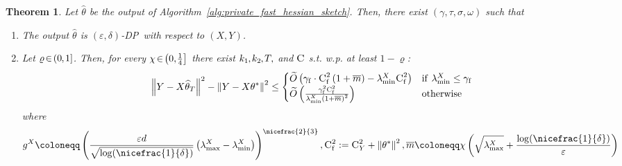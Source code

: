 \documentclass[11pt]{article}
\newtheorem{thm}{Theorem}
\theoremstyle{definition}
\theoremstyle{plain}
\providecommand{\algorithmref}[1]{Algorithm~\ref{#1}}
\newcommand{\eps}{{\varepsilon}}
\newcommand{\Norm}[1]{\left\| #1 \right\|}
\providecommand{\norm}[1]{\Norm{#1}}
\newcommand{\DP}{{\normalfont DP}~}
\renewcommand{\eps}{\varepsilon}
\begin{document}
\begin{thm}
    \label{thm:main_fihm}
    Let $\widehat{\theta}$ be the output of \algorithmref{alg:private_fast_hessian_sketch}. Then, there exist $(\gamma, \tau, \sigma, \omega)$ such that 
    \begin{enumerate}
        \item The output $\widehat{\theta}$ is $(\eps, \delta)$-\DP with respect to $(X,Y)$. 
        \item Let \(\varrho \hspace{-0.15em}\in\hspace{-0.15em} (0\hspace{-0.05em},\hspace{-0.05em}1]\). Then, for every \(\chi \hspace{-0.15em}\in\hspace{-0.15em} \bigl(0,\hspace{-0.1em}\frac{1}{4}\bigr]\) there exist \(k_1\hspace{-0.05em},\hspace{-0.05em} k_2\hspace{-0.05em},\hspace{-0.05em} T,\) and \(\textsc{C}\) s.t. w.p. at least \(1-\varrho\):
        \vspace{-0.2em}
        \begin{equation}
            \label{eq:iterative_fast_hessian_sketch_bound_empirical}
            \norm{Y - X\widehat{\theta}_T}^2 - \norm{Y - X\theta^{*}}^2 \leq \begin{cases}
                \widetilde{O}\left(\gamma_{\mathrm{f}}\cdot \textsc{C}^2_{\mathrm{f}}\left(1 + \overline{m}\right) - \lambda^{X}_{\min}\textsc{C}^2_{\mathrm{f}}\right)    &\mathrm{if} \ \lambda^{X}_{\min} \leq \gamma_{\mathrm{f}}\\
                \widetilde{O}\left(\frac{\gamma^2_{\mathrm{f}}\textsc{C}^2_{\mathrm{f}}}{\lambda^{X}_{\min}\left(1 + \overline{m}\right)^2}\right) & \mathrm{otherwise}
            \end{cases}
        \end{equation}
        where 
        \vspace{-1.0em}
        \begin{equation}   
            \label{eq:asymptotic_fastIHM}
            g^{X} \coloneqq \left(\frac{\eps d}{\sqrt{\log(\nicefrac{1}{\delta})}}\left(\lambda^{X}_{\max} - \lambda^{X}_{\min}\right)\right)^{\nicefrac{2}{3}}, \textsc{C}^2_{\mathrm{f}}:= \textsc{C}^2_{Y} + \norm{\theta^{*}}^2, \overline{m} \coloneqq \chi \left(\sqrt{\lambda^{X}_{\max}} + \frac{\log(\nicefrac{1}{\delta})}{\eps}\right) 

\end{equation}
\end{enumerate}
\end{thm}
\end{document}
